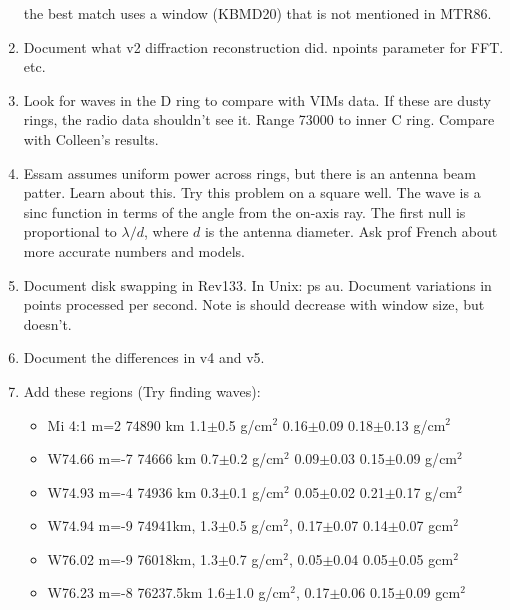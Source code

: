 \documentclass[crop=false,class=book]{standalone}
\begin{document}
\begin{enumerate}
                      the best match uses a window (KBMD20) that is not
                      mentioned in MTR86.
                \item Document what v2 diffraction reconstruction did.
                      npoints parameter for FFT. etc.
                \item Look for waves in the D ring to compare
                      with VIMs data.
                      If these are dusty rings, the radio data shouldn't
                      see it. Range 73000 to inner C ring. Compare with
                      Colleen's results.
                \item Essam assumes uniform power across rings,
                      but there is
                      an antenna beam patter. Learn about this. Try this
                      problem on a square well.
                      The wave is a sinc function
                      in terms of the angle from the on-axis ray.
                      The first null is proportional to
                      $\lambda/d$, where
                      $d$ is the antenna diameter. Ask prof French about
                      more accurate numbers and models.
                \item Document disk swapping in Rev133. In Unix: ps au.
                      Document variations in points processed per second.
                      Note is should decrease with window size, but
                      doesn't.
                \item Document the differences in v4 and v5.
                \item Add these regions (Try finding waves):
                \begin{itemize}
                    \item Mi 4:1 m=2  74890 km  1.1$\pm$0.5 g/$\textrm{cm}^2$  0.16$\pm$0.09  0.18$\pm$0.13 g/$\textrm{cm}^2$
                    \item W74.66 m=-7 74666 km  0.7$\pm$0.2 g/$\textrm{cm}^2$  0.09$\pm$0.03  0.15$\pm$0.09 g/$\textrm{cm}^2$
                    \item W74.93 m=-4 74936 km  0.3$\pm$0.1 g/$\textrm{cm}^2$  0.05$\pm$0.02  0.21$\pm$0.17 g/$\textrm{cm}^2$
                    \item W74.94 m=-9 74941km,  1.3$\pm$0.5 g/$\textrm{cm}^2$, 0.17$\pm$0.07  0.14$\pm$0.07 g$\textrm{cm}^2$
                    \item W76.02 m=-9 76018km,  1.3$\pm$0.7 g/$\textrm{cm}^2$, 0.05$\pm$0.04  0.05$\pm$0.05 g$\textrm{cm}^2$
                    \item W76.23 m=-8 76237.5km 1.6$\pm$1.0 g/$\textrm{cm}^2$, 0.17$\pm$0.06  0.15$\pm$0.09 g$\textrm{cm}^2$

\end{itemize}
\end{enumerate}
\end{document}
